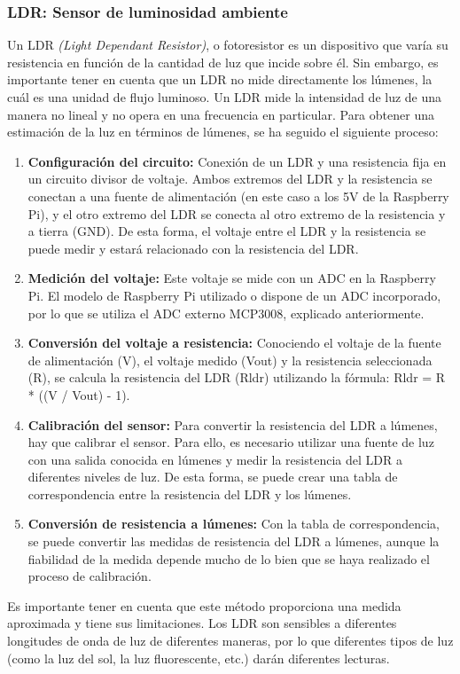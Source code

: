         \subsubsection{LDR: Sensor de luminosidad ambiente}
        Un LDR \textit{(Light Dependant Resistor)}, o fotoresistor es un dispositivo que varía su resistencia en función de la cantidad de luz que incide sobre él. Sin embargo, es importante tener en cuenta que un LDR no mide directamente los lúmenes, la cuál es una unidad de flujo luminoso. Un LDR mide la intensidad de luz de una manera no lineal y no opera en una frecuencia en particular. 
        Para obtener una estimación de la luz en términos de lúmenes, se ha seguido el siguiente proceso:    
        \begin{enumerate}    
            \item \textbf{Configuración del circuito:} 
            Conexión de un LDR y una resistencia fija en un circuito divisor de voltaje. Ambos extremos del LDR y la resistencia se conectan a una fuente de alimentación (en este caso a los 5V de la Raspberry Pi), y el otro extremo del LDR se conecta al otro extremo de la resistencia y a tierra (GND). De esta forma, el voltaje entre el LDR y la resistencia se puede medir y estará relacionado con la resistencia del LDR.   
            \item \textbf{Medición del voltaje:} 
            Este voltaje se mide con un ADC en la Raspberry Pi. El modelo de Raspberry Pi utilizado o dispone de un ADC incorporado, por lo que se utiliza el ADC externo MCP3008, explicado anteriormente.        
            \item \textbf{Conversión del voltaje a resistencia:} 
            Conociendo el voltaje de la fuente de alimentación (V), el voltaje medido (Vout) y la resistencia seleccionada (R), se calcula la resistencia del LDR (Rldr) utilizando la fórmula: Rldr = R * ((V / Vout) - 1).        
            \item \textbf{Calibración del sensor:} 
            Para convertir la resistencia del LDR a lúmenes, hay que calibrar el sensor. Para ello, es necesario utilizar una fuente de luz con una salida conocida en lúmenes y medir la resistencia del LDR a diferentes niveles de luz. De esta forma, se puede crear una tabla de correspondencia entre la resistencia del LDR y los lúmenes.   
            \item \textbf{Conversión de resistencia a lúmenes:} 
            Con la tabla de correspondencia, se puede convertir las medidas de resistencia del LDR a lúmenes, aunque la fiabilidad de la medida depende mucho de lo bien que se haya realizado el proceso de calibración.
        \end{enumerate}        
        Es importante tener en cuenta que este método proporciona una medida aproximada y tiene sus limitaciones. Los LDR son sensibles a diferentes longitudes de onda de luz de diferentes maneras, por lo que diferentes tipos de luz (como la luz del sol, la luz fluorescente, etc.) darán diferentes lecturas.   
